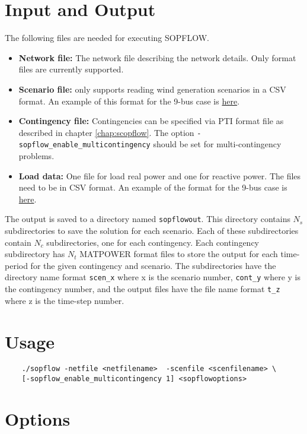 \section{Input and Output}
The following files are needed for executing SOPFLOW.
\begin{itemize}
    \item \textbf{Network file:} The network file describing the network details. Only \matpower format files are currently supported.
    \item \textbf{Scenario file:} \sopflow only supports reading wind generation scenarios in a CSV format. An example of this format for the 9-bus case is \href{https://gitlab.pnnl.gov/exasgd/frameworks/exago/-/tree/master/datafiles/case9/scenarios_9bus.csv}{here}.
    \item \textbf{Contingency file:} Contingencies can be specified via PTI format file as described in chapter \ref{chap:scopflow}. The option \lstinline{-sopflow_enable_multicontingency} should be set for multi-contingency problems.
    \item \textbf{Load data:} One file for load real power and one for reactive power. The files need to be in CSV format. An example of the format for the 9-bus case is \href{https://gitlab.pnnl.gov/exasgd/frameworks/exago/-/tree/master/datafiles/case9}{here}.
\end{itemize}

The \sopflow output is saved to a directory named \texttt{sopflowout}. This
directory contains $N_s$ subdirectories to save the solution for each scenario.
Each of these subdirectories contain $N_c$ subdirectories, one for each
contingency. Each contingency subdirectory has $N_t$ MATPOWER format files to
store the output for each time-period for the given contingency and scenario.
The subdirectories have the directory name format \texttt{scen_x} where x is
the scenario number,  \texttt{cont_y} where y is the contingency number, and
the output files have the file name format \texttt{t_z} where z is the time-step number.

\section{Usage}
\begin{lstlisting}
    ./sopflow -netfile <netfilename>  -scenfile <scenfilename> \
    [-sopflow_enable_multicontingency 1] <sopflowoptions>
\end{lstlisting}

\section{Options}

